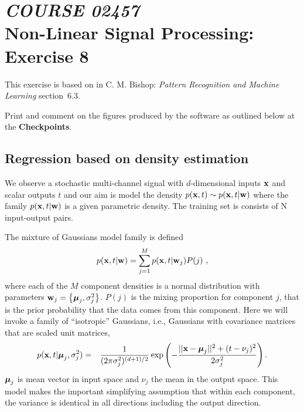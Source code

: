 \documentclass[12pt]{article}    %
\def\xb{{\bf x}}
\def\wb{{\bf w}}
\def\mub{\text{\boldmath $\mu$}}
\begin{document}
\section*{{\it COURSE 02457}\\[5mm] Non-Linear Signal Processing: Exercise 8}



This exercise is based on in C. M. Bishop: {\em Pattern
Recognition and Machine Learning} section~6.3.

Print and comment on the figures produced by the software as
outlined below at the {\bf Checkpoints}.

\subsection*{Regression based on density estimation}



We observe a stochastic multi-channel signal with $d$-dimensional
inputs $\xb$ and scalar outputs $t$ and our aim is model the
density $p(\xb,t) \sim p(\xb,t|\wb)$ where the family
$p(\xb,t|\wb)$ is a given parametric density. The training set is
consists of N input-output pairs.

The mixture of Gaussians model family is defined
\begin{eqnarray}
p(\xb,t|\wb) = \sum_{j=1}^{M} p(\xb,t|\wb_j)P(j) \ , \nonumber
\end{eqnarray}
where each of the $M$ component densities is a normal
distribution with parameters $\wb_j = \left\{\mub_j, \sigma^{2}_j  \right\}$. $P(j)$ is the mixing proportion for component $j$,
that is the prior probability that the data comes from this
component. Here we will invoke a family of ``isotropic''
Gaussians, i.e., Gaussians with covariance matrices that are
scaled unit matrices,
\begin{eqnarray}
p(\xb,t|\mub_j,\sigma^{2}_j) &=&
\frac{1}{(2\pi\sigma^{2}_{j})^{(d+1)/2}} \exp\left(-\frac{||\xb
-\mub_j||^2 + (t - \nu_j)^2}{2\sigma^{2}_j}\right). \nonumber
\end{eqnarray}
$\mub_j$ is mean vector in input space and $\nu_j$ the mean in the
output space. This model makes the important simplifying
assumption that within each component, the variance is identical
in all directions including the output direction.
\end{document}
